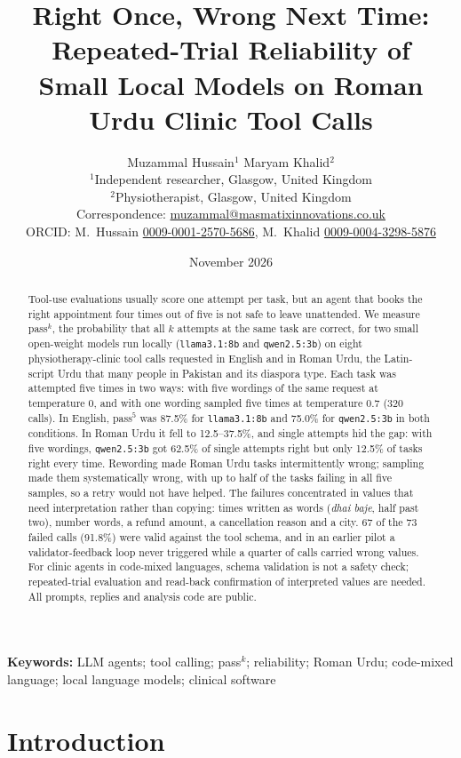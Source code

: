 \documentclass[11pt,a4paper]{article}
\title{\textbf{Right Once, Wrong Next Time: Repeated-Trial Reliability of\\Small Local Models on Roman Urdu Clinic Tool Calls}}
\author{Muzammal Hussain$^{1}$ \qquad Maryam Khalid$^{2}$\\[4pt]
\small $^{1}$Independent researcher, Glasgow, United Kingdom\\
\small $^{2}$Physiotherapist, Glasgow, United Kingdom\\
\small Correspondence: \href{mailto:muzammal@masmatixinnovations.co.uk}{muzammal@masmatixinnovations.co.uk}\\
\small ORCID: M.\ Hussain \href{https://orcid.org/0009-0001-2570-5686}{0009-0001-2570-5686}, M.\ Khalid \href{https://orcid.org/0009-0004-3298-5876}{0009-0004-3298-5876}}
\date{\small November 2026}
\newcommand{\code}[1]{\texttt{#1}}
\newcommand{\passk}[1]{pass$^{#1}$}
\begin{document}
\maketitle

\begin{abstract}
\noindent
Tool-use evaluations usually score one attempt per task, but an agent that books the right appointment four times
out of five is not safe to leave unattended. We measure \passk{k}, the probability that all $k$ attempts at the same
task are correct, for two small open-weight models run locally (\code{llama3.1:8b} and \code{qwen2.5:3b}) on eight
physiotherapy-clinic tool calls requested in English and in Roman Urdu, the Latin-script Urdu that many people in
Pakistan and its diaspora type. Each task was attempted five times in two ways: with five wordings of the same
request at temperature 0, and with one wording sampled five times at temperature 0.7 (320 calls). In English,
\passk{5} was 87.5\% for \code{llama3.1:8b} and 75.0\% for \code{qwen2.5:3b} in both conditions. In Roman Urdu it
fell to 12.5--37.5\%, and single attempts hid the gap: with five wordings, \code{qwen2.5:3b} got 62.5\% of single
attempts right but only 12.5\% of tasks right every time. Rewording made Roman Urdu tasks intermittently wrong;
sampling made them systematically wrong, with up to half of the tasks failing in all five samples, so a retry would
not have helped. The failures concentrated in values that need interpretation rather than copying: times written as
words (\emph{dhai baje}, half past two), number words, a refund amount, a cancellation reason and a city. 67 of the 73
failed calls (91.8\%) were valid against the tool schema, and in an earlier pilot a validator-feedback loop never
triggered while a quarter of calls carried wrong values. For clinic agents in code-mixed languages, schema
validation is not a safety check; repeated-trial evaluation and read-back confirmation of interpreted values are
needed. All prompts, replies and analysis code are public.
\end{abstract}

\noindent\textbf{Keywords:} LLM agents; tool calling; pass$^k$; reliability; Roman Urdu; code-mixed language; local language models; clinical software

\section{Introduction}
\end{document}

